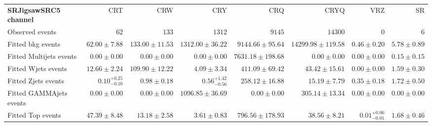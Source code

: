 

\begin{table}
\begin{center}
\setlength{\tabcolsep}{0.0pc}
{\tiny
\begin{tabular*}{\textwidth}{@{\extracolsep{\fill}}lrrrrrrr}
\noalign{\smallskip}\hline\noalign{\smallskip}
{\bf SRJigsawSRC5 channel}           & CRT            & CRW            & CRY            & CRQ            & CRYQ            & VRZ            & SR              \\[-0.05cm]
\noalign{\smallskip}\hline\noalign{\smallskip}
Observed events          & $62$              & $133$              & $1312$              & $9145$              & $14300$              & $0$              & $6$                    \\
\noalign{\smallskip}\hline\noalign{\smallskip}
Fitted bkg events         & $62.00 \pm 7.88$          & $133.00 \pm 11.53$          & $1312.00 \pm 36.22$          & $9144.66 \pm 95.64$          & $14299.98 \pm 119.58$          & $0.46 \pm 0.20$          & $5.78 \pm 0.89$              \\
\noalign{\smallskip}\hline\noalign{\smallskip}
        Fitted Multijets events         & $0.00 \pm 0.00$          & $0.00 \pm 0.00$          & $0.00 \pm 0.00$          & $7631.18 \pm 198.68$          & $0.00 \pm 0.00$          & $0.00 \pm 0.00$          & $0.15 \pm 0.15$              \\
        Fitted Wjets events         & $12.66 \pm 2.24$          & $109.90 \pm 12.22$          & $4.09 \pm 3.34$          & $411.09 \pm 69.42$          & $43.42 \pm 15.61$          & $0.00 \pm 0.00$          & $1.59 \pm 0.30$              \\
        Fitted Zjets events         & $0.10_{-0.10}^{+0.25}$          & $0.98 \pm 0.18$          & $0.56_{-0.56}^{+1.42}$          & $258.12 \pm 16.88$          & $15.19 \pm 7.79$          & $0.35 \pm 0.18$          & $1.72 \pm 0.50$              \\
        Fitted GAMMAjets events         & $0.00 \pm 0.00$          & $0.00 \pm 0.00$          & $1096.85 \pm 36.69$          & $0.00 \pm 0.00$          & $305.14 \pm 13.34$          & $0.00 \pm 0.00$          & $0.00 \pm 0.00$              \\
        Fitted Top events         & $47.39 \pm 8.48$          & $13.18 \pm 2.58$          & $3.61 \pm 0.83$          & $796.56 \pm 178.93$          & $38.56 \pm 8.21$          & $0.01_{-0.01}^{+0.06}$          & $1.68 \pm 0.46$              \\

\end{tabular*}}
\end{center}
\end{table}
